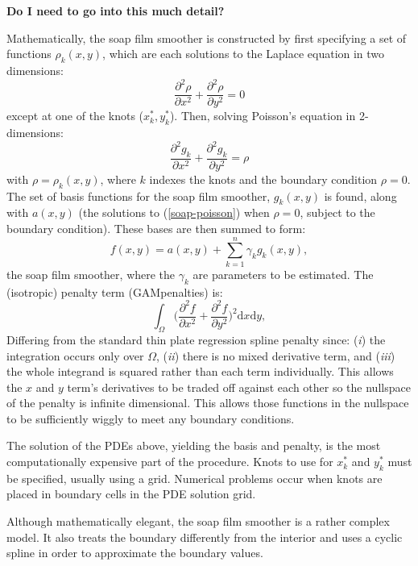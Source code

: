 \documentclass[10pt]{article}
\begin{document}
\begin{itemize}
\textbf{Do I need to go into this much detail?}

Mathematically, the soap film smoother is constructed by first specifying a set of functions $\rho_k(x,y)$, which are each solutions to the Laplace equation in two dimensions:
\begin{equation}
\frac{\partial^2\rho}{\partial x^2} + \frac{\partial^2\rho}{\partial y^2} = 0
\end{equation}
except at one of the knots ($x^*_k,y^*_k$). Then, solving Poisson's equation in 2-dimensions:
\begin{equation}
\frac{\partial^2 g_k}{\partial x^2} + \frac{\partial^2 g_k}{\partial y^2} = \rho
\label{soap-poisson}
\end{equation}
with $\rho=\rho_k(x,y)$, where $k$ indexes the knots and the boundary condition $\rho=0$. The set of basis functions for the soap film smoother, $g_k(x,y)$ is found, along with $a(x,y)$ (the solutions to (\ref{soap-poisson}) when $\rho=0$, subject to the boundary condition). These bases are then summed to form:
\begin{equation}
f(x,y)=a(x,y)+\sum_{k=1}^n \gamma_k g_k(x,y),
\end{equation}
the soap film smoother, where the $\gamma_k$ are parameters to be estimated. The (isotropic) penalty term (GAMpenalties) is:
\begin{equation}
\int_\Omega \Big(\frac{\partial^2 f}{\partial x^2}+\frac{\partial^2 f}{\partial y^2} \Big)^2\text{d}x\text{d}y,
\end{equation}
Differing from the standard thin plate regression spline penalty since: (\emph{i}) the integration occurs only over $\Omega$, (\emph{ii}) there is no mixed derivative term, and (\emph{iii}) the whole integrand is squared rather than each term individually. This allows the $x$ and $y$ term's derivatives to be traded off against each other so the nullspace of the penalty is infinite dimensional. This allows those functions in the nullspace to be sufficiently wiggly to meet any boundary conditions.

The solution of the PDEs above, yielding the basis and penalty, is the most computationally expensive part of the procedure. Knots to use for $x_k^*$ and $y_k^*$ must be specified, usually using a grid. Numerical problems occur when knots are placed in boundary cells in the PDE solution grid.

Although mathematically elegant, the soap film smoother is a rather complex model. It also treats the boundary differently from the interior and uses a cyclic spline in order to approximate the boundary values. 


\end{itemize}
\end{document}
